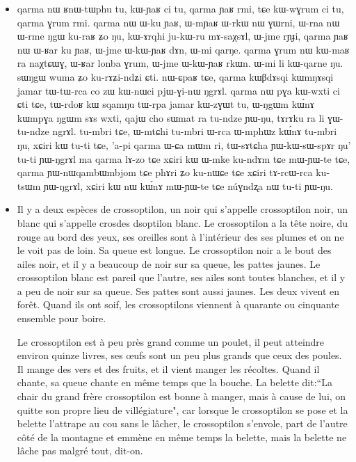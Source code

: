 \documentclass[oldfontcommands,oneside,a4paper,11pt]{memoir}
\begin{document}
\begin{itemize}


\item qarma nɯ ʁnɯ-tɯphu tu, kɯ-ɲaʁ ci tu, qarma ɲaʁ rmi, tɕe kɯ-wɣrum ci tu, qarma ɣrum rmi. qarma nɯ ɯ-ku ɲaʁ, ɯ-mɲaʁ ɯ-rkɯ nɯ ɣɯrni, ɯ-rna nɯ ɯ-rme ŋgɯ ku-raʁ ʑo ŋu,  kɯ-ɤrqhi ju-kɯ-ru mɤ-saχsɤl, ɯ-jme rɲɟi, qarma ɲaʁ nɯ ɯ-ʁar ku ɲaʁ, ɯ-jme ɯ-kɯ-ɲaʁ dɤn, ɯ-mi qarŋe. qarma ɣrum nɯ kɯ-maʁ ra naχtɕɯɣ, ɯ-ʁar lonba ɣrum, ɯ-jme ɯ-kɯ-ɲaʁ rkɯn. ɯ-mi li kɯ-qarne ŋu. sɯŋgɯ wuma ʑo ku-rɤʑi-ndʑi ɕti. nɯ-ɕpaʁ tɕe, qarma kɯβdɤsqi kɯmŋɤsqi jamar tɯ-tɯ-rca co zɯ kɯ-nɯci pjɯ-ɣi-nɯ ŋgrɤl. qarma nɯ pɣa kɯ-wxti ci ɕti tɕe, tɯ-rdoʁ kɯ sqamŋu tɯ-rpa jamar kɯ-zɣɯt tu, ɯ-ŋgɯm kɯ́nɤ kɯmpɣa ŋgɯm sɤs wxti, qajɯ cho sɯmat ra tu-ndze ɲɯ-ŋu, tɤrɤku ra  li ɣɯ-tu-ndze ngrɤl. tu-mbri tɕe, ɯ-mtɕhi tu-mbri ɯ-rca ɯ-mphɯz kɯ́nɤ tu-mbri ŋu, xɕiri kɯ tu-ti tɕe, 'a-pi qarma ɯ-ɕa mɯm ri, tɯ-sɤtɕha ɲɯ-kɯ-sɯ-spɤr ŋu' tu-ti ɲɯ-ŋgrɤl ma qarma lɤ-zo tɕe xɕiri kɯ ɯ-mke ku-ndɤm tɕe mɯ-ɲɯ-te tɕe, qarma ɲɯ-nɯqambɯmbjom tɕe phɤri ʑo ku-nɯɕe tɕe xɕiri tɤ-rcɯ-rca ku-tsɯm ɲɯ-ŋgrɤl, xɕiri kɯ nɯ kɯ́nɤ mɯ-ɲɯ-te tɕe núɣndʐa nɯ tu-ti ɲɯ-ŋu.


\item Il y a deux espèces de crossoptilon, un noir qui s'appelle crossoptilon noir, un blanc qui s'appelle crosdes dsoptilon blanc. Le crossoptilon a la tête noire, du rouge au bord des yeux, ses oreilles sont à l'intérieur des ses plumes et on ne le voit pas de loin. Sa queue est longue. Le crossoptilon noir a le bout des ailes noir, et il y a beaucoup de noir sur sa queue, les pattes jaunes. Le crossoptilon blanc est pareil que l'autre, ses ailes sont toutes blanches, et il y a peu de noir sur sa queue. Ses pattes sont aussi jaunes. Les deux vivent en forêt. Quand ils ont soif, les crossoptilons viennent à quarante ou cinquante ensemble pour boire. 

Le crossoptilon est à peu près grand comme un poulet, il peut atteindre environ quinze livres, ses œufs sont un peu plus grands que ceux des poules. Il mange des vers et des fruits, et il vient manger les récoltes. Quand il chante, sa queue chante en même temps que la bouche. La belette dit:``La chair du grand frère crossoptilon est bonne à manger, mais à cause de lui, on quitte son propre lieu de villégiature", car lorsque le crossoptilon se pose et la belette l'attrape au cou sans le lâcher, le crossoptilon s'envole, part de l'autre côté de la montagne et emmène en même temps la belette, mais la belette ne lâche pas malgré tout, dit-on.
\end{itemize}
\end{document}

